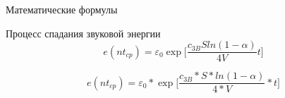 \begin{frame}[fragile]{Математические формулы}
  \begin{flushleft}
    \pause
    \Large
    Процесс спадания звуковой энергии
    \begin{equation*}
      e(nt_{cp}) = \varepsilon_0 \exp\Bigg[ \frac{c_{3B} S ln(1 -
        \alpha)}{4V}t \Bigg]
    \end{equation*}
  \end{flushleft}
  \pause
  \begin{latexcode}
    \begin{equation*}
      e(nt_{cp}) = \varepsilon_0  * \exp
      \Bigg[
      \frac{c_{3B} * S * ln(1 -\alpha)} {4 * V} * t
      \Bigg]
    \end{equation*}
  \end{latexcode}
\end{frame}

